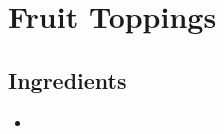 \thispagestyle{fancy}
\section{Fruit Toppings}
\AddToShipoutPicture*{\FruitTopping}

\subsection*{Ingredients}
\begin{multicols}{3}
	\begin{itemize}
		\item 
	\end{itemize}
\end{multicols}
